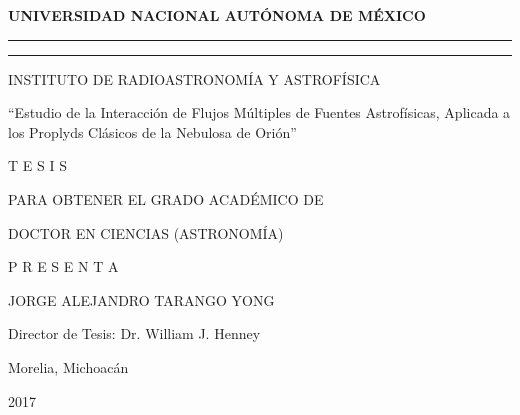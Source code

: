 \begin{center}
\textbf{UNIVERSIDAD NACIONAL AUT\'ONOMA DE M\'EXICO}

\rule{\linewidth}{0.1pt}

\rule[3mm]{0.7\linewidth}{1pt}

INSTITUTO DE RADIOASTRONOM\'IA Y ASTROF\'ISICA

``Estudio de la Interacción de Flujos Múltiples de Fuentes Astrofísicas, Aplicada
a los Proplyds Clásicos de la Nebulosa de Orión''


T E S I S

PARA OBTENER EL GRADO ACADÉMICO DE

DOCTOR EN CIENCIAS (ASTRONOMÍA)



P R E S E N T A

JORGE ALEJANDRO TARANGO YONG

Director de Tesis: Dr. William J. Henney


Morelia, Michoacán

2017
\end{center}